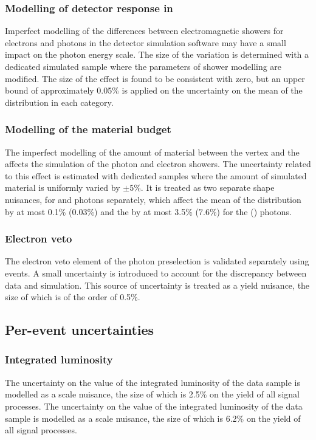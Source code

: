 \subsubsection{Modelling of detector response in \Geant}
Imperfect modelling of the differences between electromagnetic showers for electrons and photons in the detector simulation software \Geant may have a small impact on the photon energy scale. The size of the variation is determined with a dedicated simulated sample where the parameters of shower modelling are modified. The size of the effect is found to be consistent with zero, but an upper bound of approximately 0.05\% is applied on the uncertainty on the mean of the \mgg distribution in each category.

\subsubsection{Modelling of the material budget}
The imperfect modelling of the amount of material between the vertex and the \ECAL affects the simulation of the photon and electron showers. The uncertainty related to this effect is estimated with dedicated samples where the amount of simulated material is uniformly varied by $\pm 5\%$. It is treated as two separate shape nuisances, for \EB and \EE photons separately, which affect the mean of the \mgg distribution by at most 0.1\% (0.03\%) and the \effSigma by at most 3.5\% (7.6\%) for the \EB (\EE) photons.

\subsubsection{Electron veto}
The electron veto element of the photon preselection is validated separately using \Zmmg events. A small uncertainty is introduced to account for the discrepancy between data and simulation. This source of uncertainty is treated as a yield nuisance, the size of which is of the order of 0.5\%. 

\subsection{Per-event uncertainties}

\subsubsection{Integrated luminosity}
\ifNewAnalysis
The uncertainty on the value of the integrated luminosity of the data sample is modelled as a scale nuisance, the size of which is 2.5\% on the yield of all signal processes. 
\else
The uncertainty on the value of the integrated luminosity of the data sample is modelled as a scale nuisance, the size of which is 6.2\% on the yield of all signal processes. 
\fi

